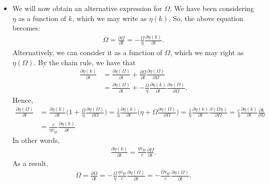 \documentclass[10pt]{article}
\newcommand{\group}{\mathrm{gr}}
\begin{document}
\begin{itemize}
    \item We will now obtain an alternative expression for $\dot \Omega$. We have been considering $\eta$ as a function of $k$, which we may write as $\eta(k)$. So, the above equation becomes:
    \begin{align*}
      \dot\Omega = \frac{\partial \Omega}{\partial t} = -\frac{\Omega}{\eta} \frac{\partial \eta(k)}{\partial t}.
    \end{align*}
    Alternatively, we can consider it as a function of $\Omega$, which we may right as $\eta(\Omega)$. By the chain rule, we have that
    \begin{align*}
      \frac{\partial \eta(k)}{\partial t} 
      &= \frac{\partial \eta(\Omega)}{\partial t} + \frac{\partial \Omega}{\partial t} \frac{\partial \eta(\Omega)}{\partial \Omega}\\
      &= \frac{\partial \eta(\Omega)}{\partial t} + - \frac{\Omega}{\eta} \frac{\partial \eta(k)}{\partial t} \frac{\partial \eta(\Omega)}{\partial \Omega}.
    \end{align*}
    Hence,
    \begin{align*}
      \frac{\partial \eta(\Omega)}{\partial t} 
      &= \frac{\partial \eta(k)}{\partial t} \bigg( 1 + \frac{\Omega}{\eta} \frac{\partial \eta(\Omega)}{\partial \Omega} \bigg)
      = \frac{1}{\eta} \frac{\partial \eta(k)}{\partial t} \bigg( \eta + \Omega \frac{\partial \eta(\Omega)}{\partial \Omega} \bigg)
      = \frac{1}{\eta} \frac{\partial \eta(k)}{\partial t} \frac{\partial (\Omega \eta)}{\partial \Omega}
      = \frac{c}{\eta} \frac{\partial \eta(k)}{\partial t} \frac{\partial k}{\partial \Omega}\\
      &= \frac{c}{\eta v_\group} \frac{\partial \eta(k)}{\partial t}      
    \end{align*}
    In other words,
    \begin{align*}
      \frac{\partial \eta(k)}{\partial t} = \frac{\eta v_\group}{c} \frac{\partial \Omega}{\partial t}.
    \end{align*}
    As a result,
    \begin{align*}
      \dot\Omega 
      = \frac{\partial \Omega}{\partial t} 
      = -\frac{\Omega}{\eta} \frac{\eta v_\group}{c} \frac{\partial \eta(\Omega)}{\partial t} 
      = -\frac{\Omega v_\group}{c} \frac{\partial \eta(\Omega)}{\partial t}.
    \end{align*}


\end{itemize}
\end{document}
